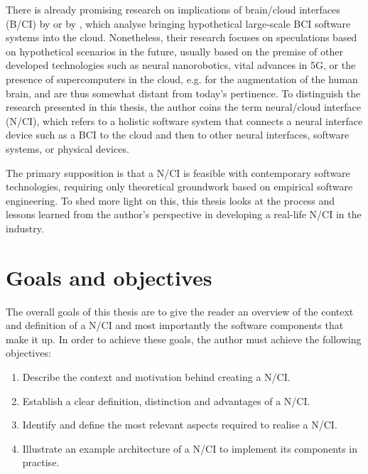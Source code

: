 There is already promising research on implications of brain/cloud interfaces (B/CI) by \citeauthor{martins_human_2019} \citeyearpar{martins_human_2019} or by \citeauthor{angelica_cognitive_2021} \citeyearpar{angelica_cognitive_2021}, which analyse bringing hypothetical large-scale BCI software systems into the cloud. Nonetheless, their research focuses on speculations based on hypothetical scenarios in the future, usually based on the premise of other developed technologies such as neural nanorobotics, vital advances in 5G, or the presence of supercomputers in the cloud, e.g. for the augmentation of the human brain, and are thus somewhat distant from today's pertinence. To distinguish the research presented in this thesis, the author coins the term neural/cloud interface (N/CI), which refers to a holistic software system that connects a neural interface device such as a BCI to the cloud and then to other neural interfaces, software systems, or physical devices.

The primary supposition is that a N/CI is feasible with contemporary software technologies, requiring only theoretical groundwork based on empirical software engineering. To shed more light on this, this thesis looks at the process and lessons learned from the author's perspective in developing a real-life N/CI in the industry.

\section{Goals and objectives}
\label{chapter1-goals-and-objectives}

The overall goals of this thesis are to give the reader an overview of the context and definition of a N/CI and most importantly the software components that make it up. In order to achieve these goals, the author must achieve the following objectives:

\begin{enumerate}
  \item Describe the context and motivation behind creating a N/CI.
  \item Establish a clear definition, distinction and advantages of a N/CI.
  \item Identify and define the most relevant aspects required to realise a N/CI.
  \item Illustrate an example architecture of a N/CI to implement its components in practise.
\end{enumerate}

